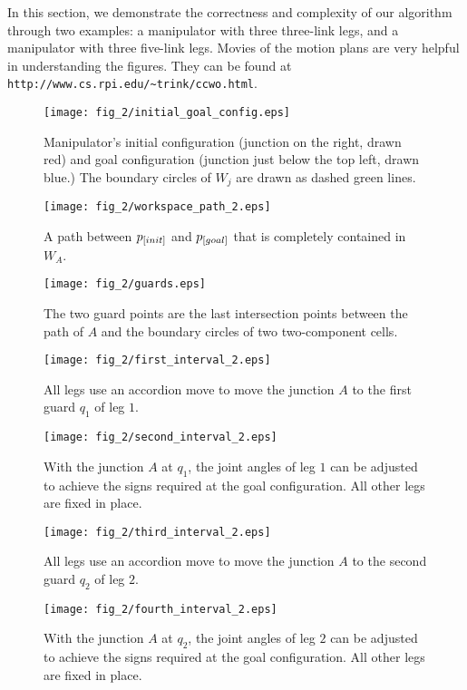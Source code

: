  \label{section-5}
In this section, we demonstrate the correctness and complexity of
our algorithm through two examples: a manipulator with three
three-link legs, and a manipulator with three five-link legs.
Movies of the motion plans are very helpful in understanding the
figures.  They can be found at
\verb$http://www.cs.rpi.edu/~trink/ccwo.html$.
%
\begin{figure}
  \centering
  \texttt{[image: fig\_2/initial\_goal\_config.eps]}
  \caption{Manipulator's initial configuration (junction on the right, drawn red)
  and goal configuration (junction just below the top left, drawn blue.) The boundary
  circles of $W_j$ are drawn as dashed green lines.}
  \label{start-goal}
\end{figure}
%
\begin{figure}
  \centering
  \texttt{[image: fig\_2/workspace\_path\_2.eps]}
  \caption{A path between $p_{\textit{\rm{[}}init]}$ and $p_{\textit{\rm{[}}goal]}$ that is completely
  contained in $W_A$.}
  \label{workspace-path}
\end{figure}
%
\begin{figure}
  \centering
  \texttt{[image: fig\_2/guards.eps]}
  \caption{The two guard points are the last intersection points between the
  path of $A$ and the boundary circles of two two-component cells.}
  \label{guard}
\end{figure}
%
\begin{figure}
  \centering
  \texttt{[image: fig\_2/first\_interval\_2.eps]}
  \caption{All legs use an accordion move to move the junction $A$
  to the first guard $q_1$ of leg $1$.}
  \label{accordion-1}
\end{figure}
%
\begin{figure}
  \centering
  \texttt{[image: fig\_2/second\_interval\_2.eps]}
  \caption{With the junction $A$ at $q_1$, the joint angles of leg $1$
can be adjusted to achieve the signs required at the goal
configuration. All other legs are fixed in place.}
  \label{adjust_sign-1}
\end{figure}
%
\begin{figure}
  \centering
  \texttt{[image: fig\_2/third\_interval\_2.eps]}
  \caption{All legs use an accordion move to move the junction $A$ to
  the second guard $q_2$ of leg $2$.}
  \label{accordion-2}
\end{figure}
%
\begin{figure}
  \centering
  \texttt{[image: fig\_2/fourth\_interval\_2.eps]}
  \caption{With the junction $A$ at $q_2$, the joint angles of leg $2$
can be adjusted to achieve the signs required at the goal
configuration. All other legs are fixed in place.}
  \label{adjust_sign-2}
\end{figure}

